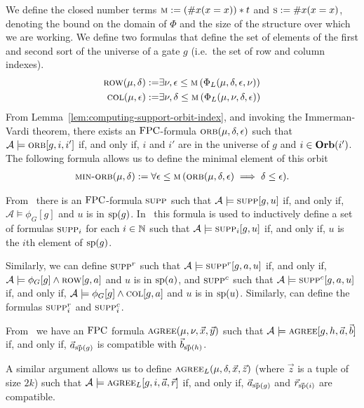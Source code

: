\documentclass[../main/thesis.tex]{subfiles}
\begin{document}
We define the closed number terms $\textsc{m} := (\# x (x = x))*t$ and $\textsc{s} := \#
x(x = x)$, denoting the bound on the domain of $\Phi$ and the size of the
structure over which we are working. We define two formulas that define the set
of elements of the first and second sort of the universe of a gate $g$ (i.e.\
the set of row and column indexes).
\begin{align*}
	\textsc{row} (\mu, \delta) :=   & \exists \nu, \epsilon \leq \textsc{m} \, (\Phi_L (\mu, \delta, \epsilon, \nu)) \\
	\textsc{col} (\mu, \epsilon) := & \exists \nu, \delta \leq \textsc{m} \, (\Phi_L (\mu, \nu, \delta , \epsilon))  
\end{align*}
From Lemma~\ref{lem:computing-support-orbit-index}, and invoking the
Immerman-Vardi theorem, there exists an $\text{\upshape FPC}$-formula $\textsc{orb}(\mu, \delta,
\epsilon)$ such that $\mathcal{A} \models \textsc{orb}[g,i, i']$ if, and only if,
$i$ and $i'$ are in the universe of $g$ and $i \in \text{\textbf{Orb}}(i')$. The following
formula allows us to define the minimal element of this orbit
\begin{align*}
	\textsc{min-orb} (\mu, \delta) := \forall \epsilon \leq \textsc{m} \, (\textsc{orb} (\mu, \delta, \epsilon) \implies \delta \leq \epsilon). 
\end{align*}

From~\cite{AndersonD17} there is an $\text{\upshape FPC}$-formula $\textsc{supp}$ such that
$\mathcal{A} \models \textsc{supp} [g, u]$ if, and only if, $\mathcal{A} \models
\phi_G [g]$ and $u$ is in $\text{sp}(g)$. In~\cite{AndersonD17} this formula is
used to inductively define a set of formulas $\textsc{supp}_i$ for each $i \in
\mathbb{N}$ such that $\mathcal{A} \models \textsc{supp}_i[g, u]$ if, and only if, $u$ is
the $i$th element of $\text{sp}(g)$.

Similarly, we can define $\textsc{supp}^r$ such that $\mathcal{A} \models
\textsc{supp}^r[g, a, u]$ if, and only if, $\mathcal{A} \models \phi_G [g] \land
\textsc{row}[g, a]$ and $u$ is in $\text{sp}(a)$, and $\textsc{supp}^c$ such that
$\mathcal{A} \models \textsc{supp}^c[g, a, u]$ if, and only if, $\mathcal{A} \models
\phi_G [g] \land \textsc{col}[g, a]$ and $u$ is in $\text{sp}(u)$. Similarly, can
define the formulas $\textsc{supp}^r_i$ and $\textsc{supp}^c_i$.

From~\cite{AndersonD17} we have an $\text{\upshape FPC}$ formula $\textsc{agree}(\mu, \nu, \vec{x},
\vec{y})$ such that $\mathcal{A} \models \textsc{agree}[g, h, \vec{a}, \vec{b}]$ if,
and only if, $\vec{a}_{\vec{\text{sp}}(g)}$ is compatible with
$\vec{b}_{\vec{\text{sp}}(h)}$.

A similar argument allows us to define $\textsc{agree}_L (\mu, \delta , \vec{x},
\vec{z})$ (where $\vec{z}$ is a tuple of size $2k$) such that $\mathcal{A}
\models \textsc{agree}_L [g, i, \vec{a}, \vec{r}]$ if, and only if,
$\vec{a}_{\vec{\text{sp}}(g)}$ and $\vec{r}_{\vec{\text{sp}}(i)}$ are compatible.
\end{document}
